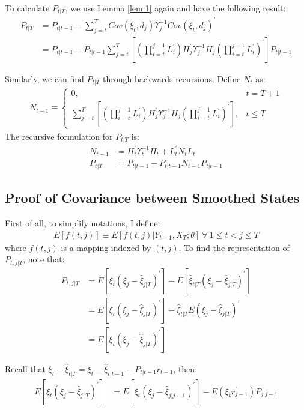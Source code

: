 \documentclass[10pt]{article}
\numberwithin{equation}{section}
\begin{document}
To calculate $P_{t|T}$, we use Lemma \ref{lem:1} again and have the following result:
\begin{align*}
    P_{t|T} &= P_{t|t-1} - \sum_{j=t}^TCov(\xi_t,d_j)\Upsilon_j^{-1}Cov(\xi_t,d_j)^{'} \\
    &=P_{t|t-1} - P_{t|t-1}\sum_{j=t}^{T}\left[\left(\prod_{i=t}^{j-1}L_{i}^{'}\right)H_j^{'}\Upsilon_j^{-1}H_j\left(\prod_{i=t}^{j-1}L_{i}^{'}\right)^{'}\right]P_{t|t-1}
\end{align*}

Similarly, we can find $P_{t|T}$ through backwards recursions. Define $N_t$ as:
\begin{align*}
    N_{t-1} \equiv \begin{cases}
        0, & t=T+1 \\
        \sum_{j=t}^{T}\left[\left(\prod_{i=t}^{j-1}L_{i}^{'}\right)H_j^{'}\Upsilon_j^{-1}H_j\left(\prod_{i=t}^{j-1}L_{i}^{'}\right)^{'}\right], & t\leq T
    \end{cases}
\end{align*}
The recursive formulation for $P_{t|T}$ is:
\begin{align*}
    N_{t-1} &= H_t^{'}\Upsilon_t^{-1}H_t + L_t^{'}N_tL_t \\
    P_{t|T} &= P_{t|t-1}- P_{t|t-1}N_{t-1}P_{t|t-1} 
\end{align*}

\subsection{Proof of Covariance between Smoothed States} \label{ap:cov_smooth}
First of all, to simplify notations, I define: 
\begin{align*}
    E[f(t,j)]\equiv E[f(t,j)|Y_{t-1},X_T;\theta] \  \forall\  1\leq t < j \leq T
\end{align*}
where $f(t,j)$ is a mapping indexed by $(t,j)$. To find the representation of $P_{t,j|T}$, note that:
\begin{align*}
    P_{t,j|T} &= E[\xi_t(\xi_j-\hat{\xi}_{j|T})^{'}] - E[\hat{\xi}_{t|T}(\xi_j-\hat{\xi}_{j|T})^{'}] \\
     &= E[\xi_t(\xi_j-\hat{\xi}_{j|T})^{'}] - \hat{\xi}_{t|T}E(\xi_j-\hat{\xi}_{j|T})^{'} \\
     &= E[\xi_t(\xi_j-\hat{\xi}_{j|T})^{'}]
\end{align*}

Recall that $\xi_t-\hat{\xi}_{t|T} = \xi_t - \hat{\xi}_{t|t-1} - P_{t|t-1}r_{t-1}$, then:
\begin{align*}
    E[\xi_t(\xi_j-\hat{\xi}_{j,T})^{'}] &= E[\xi_t(\xi_j-\hat{\xi}_{j|j-1})^{'}] - E(\xi_tr_{j-1}^{'})P_{j|j-1}
\end{align*}
\end{document}
